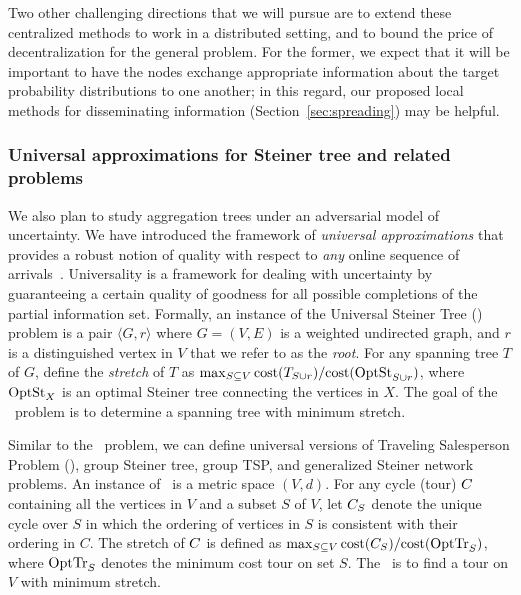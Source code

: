 Two other challenging directions that we will pursue are to extend
these centralized methods to work in a distributed setting, and to
bound the price of decentralization for the general problem.  For the
former, we expect that it will be important to have the nodes exchange
appropriate information about the target probability distributions to
one another; in this regard, our proposed local methods for
disseminating information (Section~\ref{sec:spreading}) may be
helpful.

\iffalse
RELATED WORK: karger-minkoff maybecast tree, gupta-nagarajan-ravi
paper on adaptive TSP (icalp 10), and on stochastic vrp (OR, 2012) and
refs in this for previous papers on TSP with independent demands on
nodes (Bertsimas cycle heuristic). Also the basic expected target max
is like orienteering with size bound on tree, and hence related to
k-MST. Also related to garg-gupta-leonardi-sankowsi (SODA 08) which
relates to Univ TSP.
\fi

\subsubsection{Universal approximations for Steiner tree and related problems}
\label{sec:ust}
We also plan to study aggregation trees under an adversarial model of
uncertainty.  We have introduced the framework of {\em universal
  approximations}\/ that provides a robust notion of quality with
respect to {\em any} online sequence of
arrivals~\cite{jia+lnrs:universal}.  Universality is a framework for
dealing with uncertainty by guaranteeing a certain quality of goodness
for all possible completions of the partial information set.
Formally, an instance of the Universal Steiner Tree (\ust) problem is
a pair $\langle G , r\rangle$ where $G = (V,E)$ is a weighted
undirected graph, and $r$ is a distinguished vertex in $V$ that we
refer to as the {\em root}.  For any spanning tree $T$ of $G$, define
the {\em stretch}\/ of $T$ as $\max_{S \subseteq V}\mbox{cost}(T_{S\cup
    r})/\mbox{cost}(\mbox{OptSt}_{S\cup r})$, where $\mbox{OptSt}_{X}$ is an optimal
Steiner tree connecting the vertices in $X$.  The goal of the
\ust\ problem is to determine a spanning tree with minimum stretch.

Similar to the \ust\ problem, we can define universal versions of
Traveling Salesperson Problem (\utsp), group Steiner tree, group TSP,
and generalized Steiner network problems.  An instance of \utsp\ is a
metric space $(V,d)$.  For any cycle (tour) $C$ containing all the
vertices in $V$ and a subset $S$ of $V$, let $C_S$ denote the unique
cycle over $S$ in which the ordering of vertices in $S$ is consistent
with their ordering in $C$.  The stretch of $C$ is defined as
$\max_{S\subseteq V} \mbox{cost}(C_{S})/\mbox{cost}(\mbox{OptTr}_{S})$, where $\mbox{OptTr}_{S}$
denotes the minimum cost tour on set $S$. The \utsp\ is to find a tour
on $V$ with minimum stretch.

